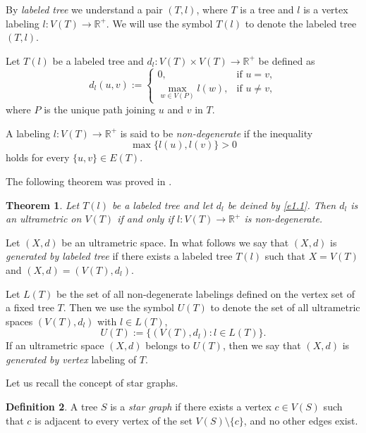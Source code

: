 \documentclass[11pt]{article}
\newtheorem{theorem}{Theorem}[section]
\theoremstyle{definition}
\newtheorem{definition}[theorem]{Definition}
\theoremstyle{remark}
\numberwithin{equation}{section}
\begin{document}
By \textit{labeled tree} we understand a pair $(T, l)$, where $T$ is a tree and $l$ is a vertex labeling
$
l \colon V(T) \to \mathbb{R}^+.
$ We will use the symbol  $T(l)$ to denote the labeled tree $(T,l)$.


Let $ T(l)$ be a labeled tree and $d_l \colon V(T) \times V(T) \to \mathbb{R}^+$ be defined as
\begin{equation}
\label{e1.1}
d_l(u, v) :=
\begin{cases}
0, & \text{if } u = v, \\
\max\limits_{w \in V(P)} l(w), & \text{if } u\neq v,
\end{cases}
\end{equation}
where $P$ is the unique path joining $u$ and $v$ in $T$.

A labeling $l \colon V(T) \to \mathbb{R}^+$ is said to be {\it non-degenerate} if the inequality 
\begin{equation*}
    \max\{l(u),l(v)\}>0
\end{equation*}
holds for every $\{u,v\}\in E(T)$.

The following theorem was proved in \cite{Dov2020TaAoG}.


\begin{theorem}
\label{t1.4}
Let $T(l)$ be a labeled tree and let $d_l $ be deined by \eqref{e1.1}. Then $d_l$ is an ultrametric on $V(T)$ if and only if
$l \colon V(T) \to \mathbb{R}^+$ is non-degenerate.
\end{theorem}

Let $(X,d)$ be an ultrametric space.
In what follows we  say that $(X,d)$ is {\it generated by  labeled tree}  if  there exists a labeled tree $T(l)$ such that $X=V(T)$ and $(X,d) = (V(T), d_l)$. 

Let $L(T)$ be the set of all non-degenerate labelings defined on the vertex set of a fixed tree $T$. 
Then we use the symbol \( U(T) \) to denote the set of all ultrametric spaces \((V(T), d_l)\) with \(l \in L(T)\),
\[
U(T) := \{ (V(T), d_l) : l \in L(T) \}.
\]
If an ultrametric 
space $(X, d)$ belongs
to $U(T)$, then we say that
$(X, d)$ is {\it generated by vertex} labeling of $T$.



Let us recall  the concept of star graphs.






\begin{definition}
\label{wer}
A tree $S$ is  a \textit{star graph} if there exists a vertex $c \in V(S)$ such that $c$ is adjacent to every vertex of the set $V(S) \setminus \{c\}$, and no other edges exist.

\end{definition}
\end{document}
